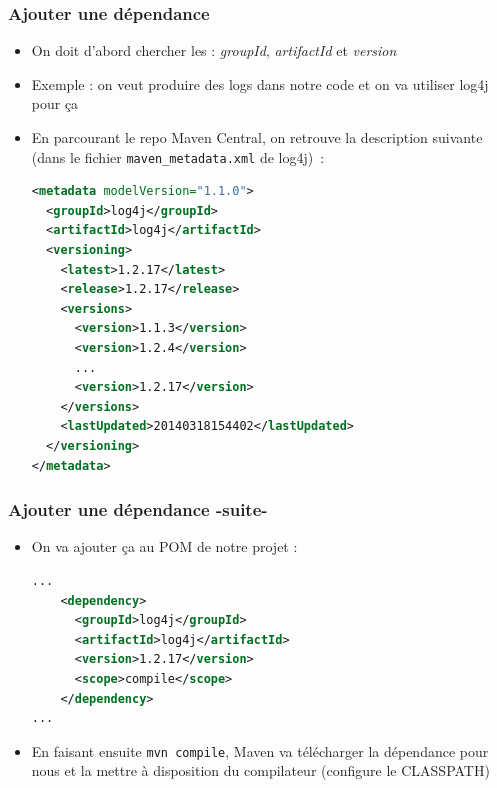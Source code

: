 \documentclass{beamer}
\begin{document}
\begin{frame}[fragile]
  \frametitle{Ajouter une dépendance}
  \begin{itemize}
  \item On doit d'abord chercher les :
    \textit{groupId}, \textit{artifactId} et \textit{version}
  \item Exemple : on veut produire des logs dans notre code et on va
    utiliser log4j pour ça
  \item En parcourant le repo Maven Central, on retrouve la
    description suivante (dans le fichier \texttt{maven\_metadata.xml} de
    log4j)~:
\begin{lstlisting}[language=XML,basicstyle=\tiny]
<metadata modelVersion="1.1.0">
  <groupId>log4j</groupId>
  <artifactId>log4j</artifactId>
  <versioning>
    <latest>1.2.17</latest>
    <release>1.2.17</release>
    <versions>
      <version>1.1.3</version>
      <version>1.2.4</version>
      ...
      <version>1.2.17</version>
    </versions>
    <lastUpdated>20140318154402</lastUpdated>
  </versioning>
</metadata>
\end{lstlisting}
\end{itemize}
\end{frame}

\begin{frame}[fragile]
  \frametitle{Ajouter une dépendance -suite-}
  \begin{itemize}
  \item On va ajouter ça au POM de notre projet :
\begin{lstlisting}[language=XML,basicstyle=\scriptsize]
...
    <dependency>
      <groupId>log4j</groupId>
      <artifactId>log4j</artifactId>
      <version>1.2.17</version>
      <scope>compile</scope>
    </dependency>  
...
\end{lstlisting}
\item En faisant ensuite \texttt{mvn compile}, Maven va télécharger la
  dépendance pour nous et la mettre à disposition du compilateur (configure le CLASSPATH)
\end{itemize}
\end{frame}
\end{document}
